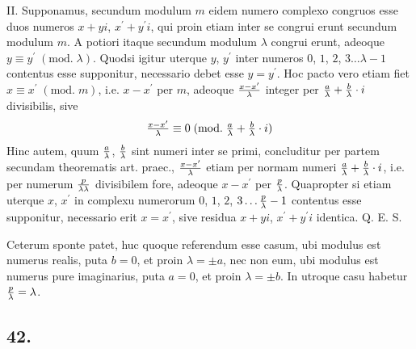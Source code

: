 \documentclass[twoside,12pt]{memoir}
\renewcommand{\pmod}[1]{\;(\textrm{mod.}\;#1)}
\let\oldfrac\frac
\def\frac#1#2{\mathchoice{\tfrac{#1}{#2}}{\oldfrac{#1}{#2}}{\genfrac{}{}{}{2}{#1}{#2\mathstrut}}{\genfrac{}{}{}{3}{#1}{#2\mathstrut}}}
\begin{document}
II. Supponamus, secundum modulum \(m\) eidem numero complexo congruos esse duos numeros \(x+y i\), \(x^{\prime}+y^{\prime} i\), qui proin etiam inter se congrui erunt secundum modulum \(m\). A potiori itaque secundum modulum \(\lambda\) congrui erunt, adeoque \(y \equiv y^{\prime}\pmod{\lambda}\). Quodsi igitur uterque \(y\), \(y^{\prime}\) inter numeros \(0\), \(1\), \(2\), \(3 \ldots \lambda-1\) contentus esse supponitur, necessario debet esse \(y=y^{\prime}\). Hoc pacto vero etiam fiet \(x \equiv x^{\prime}\pmod{m}\), i.e. \(x-x^{\prime}\) per \(m\), adeoque \(\frac{x-x^{\prime}}{\lambda}\) integer per \(\frac{a}{\lambda}+\frac{b}{\lambda} \cdot i\) divisibilis, sive
\[\frac{x-x^{\prime}}{\lambda} \equiv 0\pmod{\frac{a}{\lambda}+\frac{b}{\lambda} \cdot i}\]
Hinc autem, quum \(\frac{a}{\lambda}\), \(\frac{b}{\lambda}\) sint numeri inter se primi, concluditur per partem secundam theorematis art. praec., \(\frac{x-x^{\prime}}{\lambda}\) etiam per normam numeri \(\frac{a}{\lambda}+\frac{b}{\lambda} \cdot i\), i.e. per numerum \(\frac{p}{\lambda \lambda}\) divisibilem fore, adeoque \(x-x^{\prime}\) per \(\frac{p}{\lambda}\). Quapropter si etiam uterque \(x\), \(x^{\prime}\) in complexu numerorum \(0\), \(1\), \(2\), \(3 \ldots \frac{p}{\lambda}-1\) contentus esse supponitur, necessario erit \(x=x^{\prime}\), sive residua \(x+y i\), \(x^{\prime}+y^{\prime} i\) identica. Q. E. S.

Ceterum sponte patet, huc quoque referendum esse casum, ubi modulus est numerus realis, puta \(b=0\), et proin \(\lambda= \pm a\), nec non eum, ubi modulus est numerus pure imaginarius, puta \(a=0\), et proin \(\lambda= \pm b\). In utroque casu habetur \(\frac{p}{\lambda}=\lambda\).\pagebreak%

\subsection*{42.}
 
\end{document}
